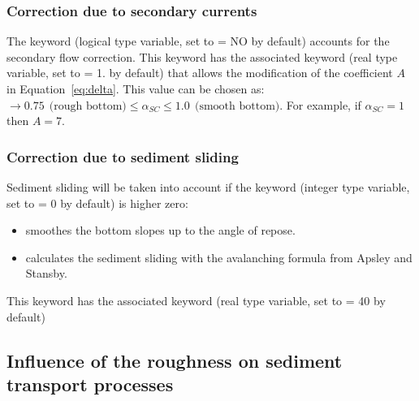 \subsubsection{Correction due to secondary currents}
The keyword  (logical type variable, set to {\ttfamily = NO} by default) accounts for the secondary flow correction. This keyword has the associated keyword  (real type variable, set to {\ttfamily = 1.} by default) that allows the modification of the coefficient $A$ in Equation~\ref{eq:delta}. This value can be chosen as: $\rightarrow 0.75~~\text{(rough bottom)} \leq \alpha_{SC} \leq 1.0~~\text{(smooth bottom)}$. For example, if $\alpha_{SC} = 1$ then $A = 7$.

\subsubsection{Correction due to sediment sliding}
Sediment sliding will be taken into account if the keyword 
(integer type variable, set to {\ttfamily = 0} by default) is higher zero:
\begin{itemize}
\item  {} smoothes the bottom slopes up to the angle of repose.
\item  {} calculates the sediment sliding with the avalanching formula from Apsley and Stansby.
\end{itemize}
This keyword has the associated keyword  (real type variable, set to {\ttfamily = 40} by default)

\subsection{Influence of the roughness on sediment transport processes}\label{sec:roug}
